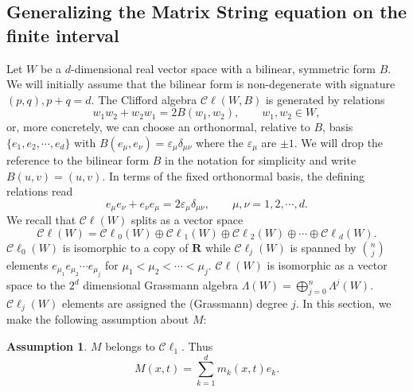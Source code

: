 \documentclass[10pt,a4paper]{article}
\numberwithin{equation}{section}
\theoremstyle{plain}
\theoremstyle{definition}
\newtheorem{assumption}[assumption]{Assumption}
\newcommand{\R}{\mathbf{R}}
\renewcommand{\epsilon}{\varepsilon}
\newcommand\Cl{\mathcal{C}\ell}
\begin{document}
\subsection{Generalizing the Matrix String equation on the finite interval} \label{sec:Clifford beam}
Let $W$ be a  $d$-dimensional real vector space with a bilinear, symmetric form $B$.  We will initially assume that the bilinear form is non-degenerate with signature $(p,q), p+q=d$. 
The Clifford algebra $\mathcal{C\ell} (W,B)$ is generated by relations 
\begin{equation} \label{eq:Clifdef}
w_1w_2+w_2w_1=2B(w_1,w_2), \qquad w_1, w_2 \in W, 
\end{equation}
or, more concretely, we can choose an orthonormal, relative to $B$, basis $\{e_1,e_2, \cdots, e_d\}$ with $B(e_\mu,e_\nu)=\epsilon_\mu \delta_{\mu\nu}$ where the $\epsilon_\mu$ are $\pm 1$.  
We will drop the reference to the bilinear form $B$ in the notation for simplicity and write $B(u,v)=(u,v)$.  
In terms of the fixed orthonormal basis, the defining relations read
\begin{equation} \label{eq:Clifdef2}
e_\mu e_\nu+e_\nu e_\mu=2\epsilon_\mu \delta_{\mu \nu} , \qquad \mu, \nu  =1,2, \cdots, d. 
\end{equation} 
We recall that $\mathcal{C\ell} (W)$ splits as a vector space
\begin{equation} 
\mathcal{C\ell} (W)=\mathcal{C\ell}_0 (W)\oplus \mathcal{C\ell}_1 (W)\oplus \mathcal{C\ell}_2 (W)\oplus\cdots \oplus \mathcal{C\ell}_d(W). 
\end{equation} 
$\Cl_0 (W)$ is isomorphic to a copy of $\R$ while $\Cl_j(W)$ is spanned by $\binom{n}{j}$ elements $e_{\mu_1}e_{\mu_2}\cdots e_{\mu_j}$ for $\mu_1<\mu_2<\cdots<\mu_j$.  
$\Cl(W)$ is isomorphic as a vector space to the $2^d$ dimensional Grassmann algebra $\Lambda(W)=\bigoplus_{j=0}^n \Lambda ^j(W)$.  $\Cl_j(W)$ elements are assigned the (Grassmann) degree $j$.  
In this section, we make the following assumption about $M$:
\begin{assumption}
$M$ belongs to $\Cl_1$.  Thus 
\begin{equation} \label{eq:assM}
M(x,t)=\sum_{k=1}^d m_k(x,t) e_k.
\end{equation}
\end{assumption} 
\end{document}
